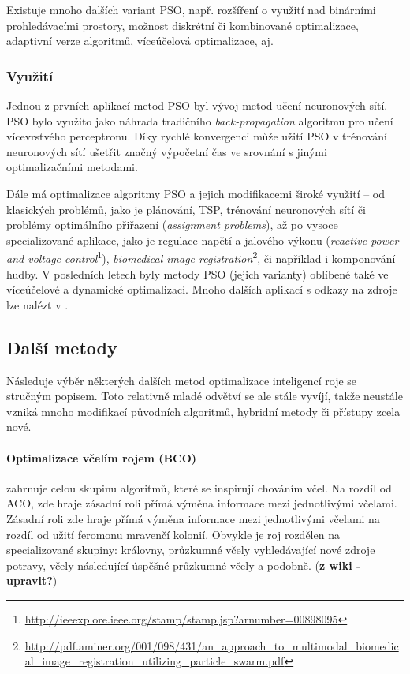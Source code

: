 \documentclass[a4paper,12pt]{article}
\begin{document}
\medskip

Existuje mnoho dalších variant PSO, např. rozšíření o využití nad binárními prohledávacími prostory, možnost
diskrétní či kombinované optimalizace, adaptivní verze algoritmů, víceúčelová optimalizace, aj.


\subsubsection{Využití}
Jednou z prvních aplikací metod PSO byl vývoj metod učení neuronových sítí. PSO bylo využito jako náhrada
tradičního {\it back-propagation} algoritmu pro učení vícevrstvého perceptronu. Díky rychlé konvergenci může
užití PSO v trénování neuronových sítí ušetřit značný výpočetní čas ve srovnání s jinými
optimalizačními metodami.

Dále má optimalizace algoritmy PSO a jejich modifikacemi široké využití -- od klasických problémů,
jako je plánování, TSP,
trénování neuronových sítí či problémy optimálního přiřazení ({\it assignment problems}), až po vysoce
specializované aplikace, jako je regulace napětí a jalového výkonu ({\it reactive power and voltage
control}\footnote{\url{http://ieeexplore.ieee.org/stamp/stamp.jsp?arnumber=00898095}}),
{\it biomedical image registration}\footnote{\url{http://pdf.aminer.org/001/098/431/an_approach_to_multimodal_biomedical_image_registration_utilizing_particle_swarm.pdf}},
či například i komponování hudby. V posledních letech byly metody PSO (jejich varianty) oblíbené také ve víceúčelové
a dynamické optimalizaci. Mnoho dalších aplikací s odkazy na zdroje lze nalézt v \cite{Blum08SwarmOpt}.

\subsection{Další metody}
Následuje výběr některých dalších metod optimalizace inteligencí roje se stručným popisem. Toto relativně mladé
odvětví se ale stále vyvíjí, takže neustále vzniká mnoho modifikací původních algoritmů, hybridní metody či
přístupy zcela nové.


\paragraph{Optimalizace včelím rojem (BCO)} {zahrnuje celou skupinu algoritmů, které se inspirují
 chováním včel. Na rozdíl od ACO, zde hraje zásadní roli přímá výměna informace mezi
 jednotlivými včelami. 
Zásadní roli zde hraje přímá výměna informace mezi jednotlivými včelami na rozdíl od užití feromonu mravenčí
kolonií. Obvykle je roj rozdělen na specializované skupiny: královny, průzkumné včely vyhledávající nové zdroje
potravy, včely následující úspěšné průzkumné včely a podobně.} ({\bf z wiki - upravit?})
\end{document}
